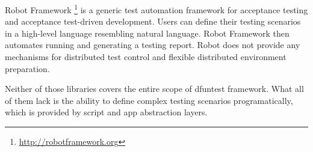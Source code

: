 Robot Framework \footnote{\url{http://robotframework.org}} is a generic test automation framework for acceptance testing and acceptance test-driven development.
Users can define their testing scenarios in a high-level language resembling natural language.
Robot Framework then automates running and generating a testing report.
Robot does not provide any mechanisms for distributed test control and flexible distributed environment preparation.

Neither of those libraries covers the entire scope of dfuntest framework. What
all of them lack is the ability to define complex testing scenarios
programatically, which is provided by script and app abstraction layers.
